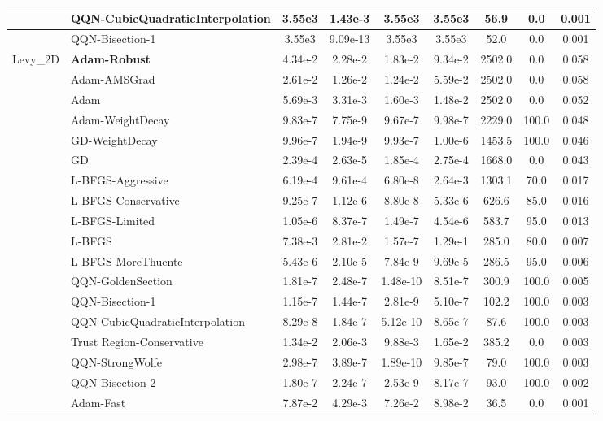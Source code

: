 \documentclass[10pt]{article}
\begin{document}
\begin{longtable}{|l|l|c|c|c|c|c|c|c|}
\hline
 & QQN-CubicQuadraticInterpolation & 3.55e3 & 1.43e-3 & 3.55e3 & 3.55e3 & 56.9 & 0.0 & 0.001 \\
\hline
 & QQN-Bisection-1 & 3.55e3 & 9.09e-13 & 3.55e3 & 3.55e3 & 52.0 & 0.0 & 0.001 \\
Levy\_2D & \textbf{Adam-Robust} & 4.34e-2 & 2.28e-2 & 1.83e-2 & 9.34e-2 & 2502.0 & 0.0 & 0.058 \\
\hline
 & Adam-AMSGrad & 2.61e-2 & 1.26e-2 & 1.24e-2 & 5.59e-2 & 2502.0 & 0.0 & 0.058 \\
\hline
 & Adam & 5.69e-3 & 3.31e-3 & 1.60e-3 & 1.48e-2 & 2502.0 & 0.0 & 0.052 \\
\hline
 & Adam-WeightDecay & 9.83e-7 & 7.75e-9 & 9.67e-7 & 9.98e-7 & 2229.0 & 100.0 & 0.048 \\
\hline
 & GD-WeightDecay & 9.96e-7 & 1.94e-9 & 9.93e-7 & 1.00e-6 & 1453.5 & 100.0 & 0.046 \\
\hline
 & GD & 2.39e-4 & 2.63e-5 & 1.85e-4 & 2.75e-4 & 1668.0 & 0.0 & 0.043 \\
\hline
 & L-BFGS-Aggressive & 6.19e-4 & 9.61e-4 & 6.80e-8 & 2.64e-3 & 1303.1 & 70.0 & 0.017 \\
\hline
 & L-BFGS-Conservative & 9.25e-7 & 1.12e-6 & 8.80e-8 & 5.33e-6 & 626.6 & 85.0 & 0.016 \\
\hline
 & L-BFGS-Limited & 1.05e-6 & 8.37e-7 & 1.49e-7 & 4.54e-6 & 583.7 & 95.0 & 0.013 \\
\hline
 & L-BFGS & 7.38e-3 & 2.81e-2 & 1.57e-7 & 1.29e-1 & 285.0 & 80.0 & 0.007 \\
\hline
 & L-BFGS-MoreThuente & 5.43e-6 & 2.10e-5 & 7.84e-9 & 9.69e-5 & 286.5 & 95.0 & 0.006 \\
\hline
 & QQN-GoldenSection & 1.81e-7 & 2.48e-7 & 1.48e-10 & 8.51e-7 & 300.9 & 100.0 & 0.005 \\
\hline
 & QQN-Bisection-1 & 1.15e-7 & 1.44e-7 & 2.81e-9 & 5.10e-7 & 102.2 & 100.0 & 0.003 \\
\hline
 & QQN-CubicQuadraticInterpolation & 8.29e-8 & 1.84e-7 & 5.12e-10 & 8.65e-7 & 87.6 & 100.0 & 0.003 \\
\hline
 & Trust Region-Conservative & 1.34e-2 & 2.06e-3 & 9.88e-3 & 1.65e-2 & 385.2 & 0.0 & 0.003 \\
\hline
 & QQN-StrongWolfe & 2.98e-7 & 3.89e-7 & 1.89e-10 & 9.85e-7 & 79.0 & 100.0 & 0.003 \\
\hline
 & QQN-Bisection-2 & 1.80e-7 & 2.24e-7 & 2.53e-9 & 8.17e-7 & 93.0 & 100.0 & 0.002 \\
\hline
 & Adam-Fast & 7.87e-2 & 4.29e-3 & 7.26e-2 & 8.98e-2 & 36.5 & 0.0 & 0.001 \\

\end{longtable}
\end{document}
